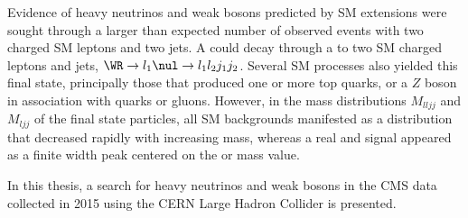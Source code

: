Evidence of heavy neutrinos \nul and weak bosons \WR predicted by SM extensions were sought through a larger 
than expected number of observed events with two charged SM leptons and two jets.  A \WR could decay through 
a \nul to two SM charged leptons and jets, $\WR \rightarrow l_{1}\nul \rightarrow l_{1}l_{2}j_{1}j_{2}$.  
Several SM processes also yielded this final state, principally those that produced one or more top quarks, or 
a $Z$ boson in association with quarks or gluons.  However, in the mass distributions $M_{lljj}$ and $M_{ljj}$ 
of the final state particles, all SM backgrounds manifested as a distribution that decreased rapidly with increasing 
mass, whereas a real \WR and \nul signal appeared as a finite width peak centered on the \WR or \nul mass value.

In this thesis, a search for heavy neutrinos \nul and weak bosons \WR in the CMS data collected 
in 2015 using the CERN Large Hadron Collider is presented.

